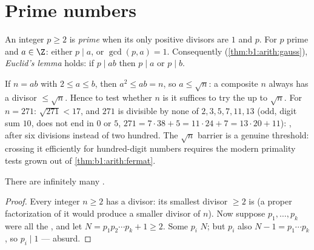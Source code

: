 \section{Prime numbers}

\begin{definition}\label{def:b1:arith:prime}
An integer $p \geq 2$ is \emph{prime} when its
only positive divisors are $1$ and $p$. For $p$ prime and $a \in \Z$:
either $p \mid a$, or $\gcd(p, a) = 1$. Consequently
(\cref{thm:b1:arith:gauss}), \emph{Euclid's lemma} holds: if $p \mid
ab$ then $p \mid a$ or $p \mid b$.
\end{definition}

\begin{remark}\label{rem:b1:arith:trialdivision}
If $n = ab$ with $2 \leq a \leq b$, then $a^2 \leq ab = n$, so $a
\leq \sqrt n$: a composite $n$ always has a  divisor $\leq
\sqrt n$. Hence to test whether $n$ is  it suffices to try
the  up to $\sqrt n$. For $n = 271$: $\sqrt{271} < 17$, and
$271$ is divisible by none of $2, 3, 5, 7, 11, 13$ (odd, digit
sum $10$, does not end in $0$ or $5$, $271 = 7\cdot38 + 5 =
11\cdot24 + 7 = 13\cdot20 + 11$): , after six divisions
instead of two hundred. The $\sqrt n$ barrier is a genuine
threshold: crossing it efficiently for hundred-digit numbers
requires the modern primality tests grown out of
\cref{thm:b1:arith:fermat}.
\end{remark}

\begin{theorem}[Euclid]\label{thm:b1:arith:euclidprimes}
There are infinitely many .
\end{theorem}

\begin{proof}
Every integer $n \geq 2$ has a  divisor: its smallest divisor
$\geq 2$ is  (a proper factorization of it would produce a
smaller divisor of $n$). Now suppose $p_1, \dots, p_k$ were all the
, and let $N = p_1 p_2 \cdots p_k + 1 \geq 2$. Some  $p_i$
 $N$; but $p_i$ also  $N - 1 = p_1\cdots p_k$, so $p_i
\mid 1$ --- absurd.
\end{proof}

